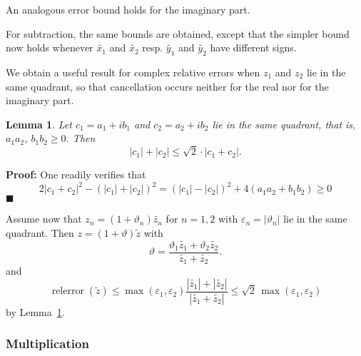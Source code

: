 \documentclass [11pt]{article}
\newcommand {\corr}[1]{{#1}}
\newcommand {\appro}[1]{\widetilde {#1}}
\newcommand{\relerror}{\operatorname {relerror}}
\renewcommand {\epsilon}{\varepsilon}
\renewcommand {\theta}{\vartheta}
\renewcommand {\leq}{\leqslant}
\renewcommand {\geq}{\geqslant}
\newtheorem{lemma}[theorem]{Lemma}
\newenvironment{proof}{\noindent \textbf {Proof:}}{{\hspace* {\fill}$\blacksquare$}}
\begin{document}
An analogous error bound holds for the imaginary part.

For subtraction, the same bounds are obtained, except that the simpler bound
now holds whenever $\appro {x_1}$ and $\appro {x_2}$ resp.
$\appro {y_1}$ and $\appro {y_2}$ have different signs.

We obtain a useful result for complex relative errors when $z_1$ and $z_2$
lie in the same quadrant, so that cancellation occurs neither for the real
nor for the imaginary part.

\begin {lemma}
\label {lm:arithgeom}
Let $c_1 = a_1 + i b_1$ and $c_2 = a_2 + i b_2$ lie in the same quadrant,
that is, $a_1 a_2$, $b_1 b_2 \geq 0$. Then
\[
|c_1| + |c_2| \leq \sqrt 2 \cdot |c_1 + c_2|.
\]
\end {lemma}

\begin {proof}
One readily verifies that
\[
2 |c_1 + c_2|^2 - (|c_1| + |c_2|)^2
= (|c_1| - |c_2|)^2 + 4 (a_1 a_2 + b_1 b_2)
\geq 0
\]
\end {proof}

Assume now that $\corr {z_n} = (1 + \theta_n) \appro {z_n}$ for $n=1,2$
with $\epsilon_n = |\theta_n|$ lie in the same quadrant.
Then
$\corr z = (1 + \theta) \appro z$
with
\[
\theta = \frac {\theta_1 \appro {z_1} + \theta_2 \appro {z_2}}
               {\appro {z_1} + \appro {z_2}}.
\]
and
\begin {equation}
\label {eq:propaddrel}
\relerror (\appro z)
\leq
\max (\epsilon_1, \epsilon_2)
   \frac {|\appro {z_1}| + |\appro {z_2}|}{|\appro {z_1} + \appro {z_2}|}
\leq
\sqrt 2 \, \max (\epsilon_1, \epsilon_2)
\end {equation}
by Lemma~\ref {lm:arithgeom}.




\subsubsection {Multiplication}
\label {sssec:propmul}
\end{document}
